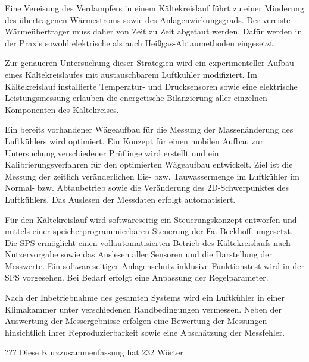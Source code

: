Eine Vereisung des Verdampfers in einem Kältekreislauf führt zu einer Minderung des übertragenen Wärmestroms sowie des Anlagenwirkungsgrads. Der vereiste Wärmeübertrager muss daher von Zeit zu Zeit abgetaut werden. Dafür werden in der Praxis sowohl elektrische als auch Heißgas-Abtaumethoden eingesetzt.

Zur genaueren Untersuchung dieser Strategien wird ein experimenteller Aufbau eines Kältekreislaufes mit austauschbarem Luftkühler modifiziert. Im Kältekreislauf installierte Temperatur- und Drucksensoren sowie eine elektrische Leistungsmessung erlauben die energetische Bilanzierung aller einzelnen Komponenten des Kältekreises.

Ein bereits vorhandener Wägeaufbau für die Messung der Massenänderung des Luftkühlers wird optimiert. Ein Konzept für einen mobilen Aufbau zur Untersuchung verschiedener Prüflinge wird erstellt und ein Kalibrierungsverfahren für den optimierten Wägeaufbau entwickelt. Ziel ist die Messung der zeitlich veränderlichen Eis- bzw. Tauwassermenge im Luftkühler im Normal- bzw. Abtaubetrieb sowie die Veränderung des 2D-Schwerpunktes des Luftkühlers. Das Auslesen der Messdaten erfolgt automatisiert.

Für den Kältekreislauf wird softwareseitig ein Steuerungskonzept entworfen und mittels einer speicherprogrammierbaren Steuerung der Fa. Beckhoff umgesetzt. Die SPS ermöglicht einen vollautomatisierten Betrieb des Kältekreislaufs nach Nutzervorgabe sowie das Auslesen aller Sensoren und die Darstellung der Messwerte. Ein softwareseitiger Anlagenschutz inklusive Funktionstest wird in der SPS vorgesehen. Bei Bedarf erfolgt eine Anpassung der Regelparameter.
 
Nach der Inbetriebnahme des gesamten Systems wird ein Luftkühler in einer Klimakammer unter verschiedenen Randbedingungen vermessen. Neben der Auswertung der Messergebnisse erfolgen eine Bewertung der Messungen hinsichtlich ihrer Reproduzierbarkeit sowie eine Abschätzung der Messfehler.

??? Diese Kurzzusammenfassung hat 232 Wörter 

